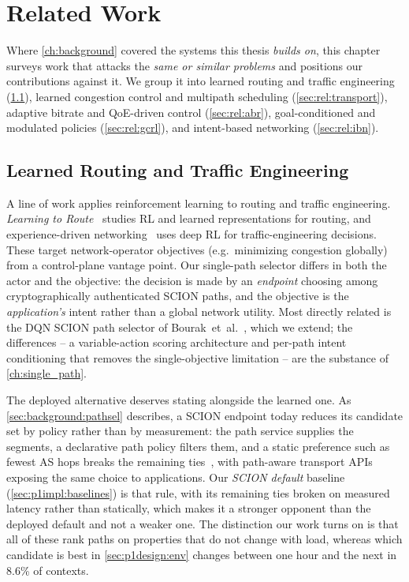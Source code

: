 \chapter{Related Work}
\label{ch:related}

Where \cref{ch:background} covered the systems this thesis \emph{builds on}, this chapter surveys work that
attacks the \emph{same or similar problems} and positions our contributions against it. We group it into
learned routing and traffic engineering (\cref{sec:rel:routing}), learned congestion control and multipath
scheduling (\cref{sec:rel:transport}), adaptive bitrate and QoE-driven control (\cref{sec:rel:abr}),
goal-conditioned and modulated policies (\cref{sec:rel:gcrl}), and intent-based networking
(\cref{sec:rel:ibn}).

\section{Learned Routing and Traffic Engineering}
\label{sec:rel:routing}

A line of work applies reinforcement learning to routing and traffic engineering. \emph{Learning to
Route}~\cite{Valadarsky2017} studies RL and learned representations for routing, and experience-driven
networking~\cite{Xu2018} uses deep RL for traffic-engineering decisions. These target network-operator
objectives (e.g.\ minimizing congestion globally) from a control-plane vantage point. Our single-path selector differs in
both the actor and the objective: the decision is made by an \emph{endpoint} choosing among
cryptographically authenticated SCION paths, and the objective is the \emph{application's} intent rather than
a global network utility. Most directly related is the DQN SCION path selector of
Bourak~et~al.~\cite{Bourak2025}, which we extend; the differences -- a variable-action scoring architecture
and per-path intent conditioning that removes the single-objective limitation -- are the substance of \cref{ch:single_path}.

The deployed alternative deserves stating alongside the learned one. As \cref{sec:background:pathsel}
describes, a SCION endpoint today reduces its candidate set by policy rather than by measurement: the
path service supplies the segments, a declarative path policy filters them, and a static preference
such as fewest AS hops breaks the remaining ties~\cite{Perrig2017}, with path-aware transport APIs
exposing the same choice to applications. Our \emph{SCION default} baseline
(\cref{sec:p1impl:baselines}) is that rule, with its remaining ties broken on measured latency rather
than statically, which makes it a stronger opponent than the deployed default and not a weaker one.
The distinction our work turns on is that all of these rank
paths on properties that do not change with load, whereas which candidate is best in
\cref{sec:p1design:env} changes between one hour and the next in 8.6\% of contexts.

